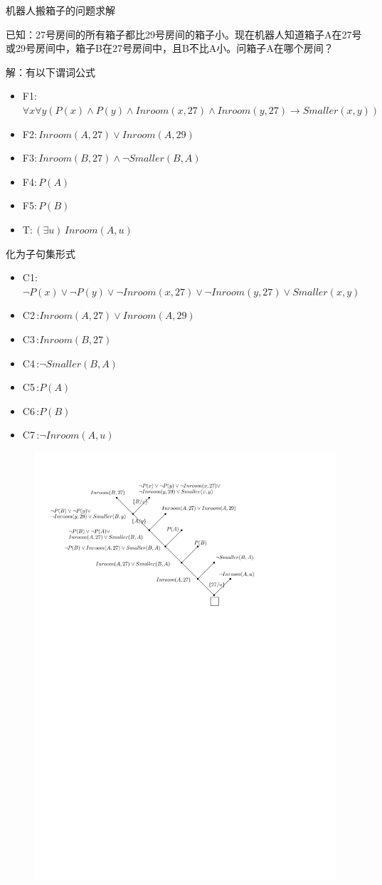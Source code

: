 \begin{example}
    机器人搬箱子的问题求解

    已知：27号房间的所有箱子都比29号房间的箱子小。现在机器人知道箱子A在27号或29号房间中，箱子B在27号房间中，且B不比A小。\textcolor{main1}{问箱子A在哪个房间？}

    \textcolor{main1}{解：}有以下谓词公式
    \begin{itemize}
        \item F1:\,$ \forall x\forall y\left( P(x)\land P(y)\land Inroom(x,27)\land Inroom(y,27)\to Smaller(x,y)  \right) $
        \item F2:\,$ Inroom(A,27)\lor Inroom(A,29) $
        \item F3:\,$ Inroom(B,27)\land \lnot Smaller(B,A) $
        \item F4:\,$P(A)$
        \item F5:\,$P(B)$
        \item T:\,$ \left( \exists u \right)\,Inroom(A,u) $
    \end{itemize}    
    化为子句集形式
    \begin{itemize}
        \item C1:\,$ \lnot P(x)\lor \lnot P(y)\lor \lnot Inroom(x,27)\lor\lnot Inroom(y,27)\lor Smaller(x,y)  $
        \item C2\,:$ Inroom(A,27)\lor Inroom(A,29) $
        \item C3\,:$ Inroom(B,27) $
        \item C4\,:$ \lnot Smaller(B,A) $
        \item C5\,:$P(A)$
        \item C6\,:$P(B)$
        \item C7\,:$ \lnot Inroom(A,u) $
    \end{itemize}
    \begin{figure}[htbp]
        \centering
        \includegraphics[width = .7\textwidth]{image/问题求解例子.pdf}
    \end{figure}


\end{example}
